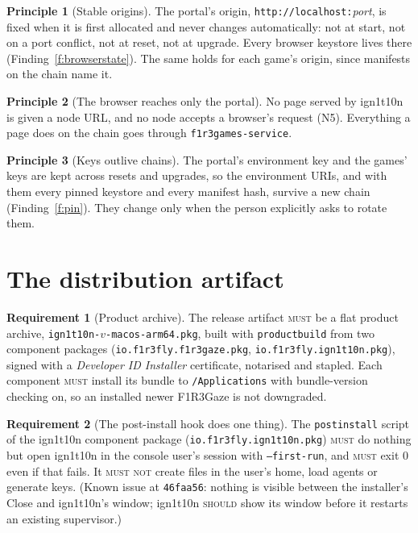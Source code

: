 \documentclass[11pt]{article}
\theoremstyle{definition}
\newtheorem{requirement}{Requirement}
\newtheorem{principle}{Principle}
\theoremstyle{remark}
\newcommand{\MUST}{\textsc{must}}
\newcommand{\MUSTNOT}{\textsc{must not}}
\newcommand{\SHOULD}{\textsc{should}}
\newcommand{\code}[1]{\texttt{#1}}
\newcommand{\Gz}{F1R3Gaze}
\newcommand{\Hr}{ign1t10n}
\newcommand{\Svc}{\code{f1r3games-service}}
\begin{document}
\begin{principle}[Stable origins]\label{p:origin}
The portal's origin, \code{http://localhost:}\textit{port}, is fixed when it is first
allocated and never changes automatically: not at start, not on a port conflict, not
at reset, not at upgrade. Every browser keystore lives there (Finding~\ref{f:browserstate}).
The same holds for each game's origin, since manifests on the chain name it.
\end{principle}

\begin{principle}[The browser reaches only the portal]\label{p:nonode}
No page served by \Hr{} is given a node URL, and no node accepts a browser's request
(N5). Everything a page does on the chain goes through \Svc{}.
\end{principle}

\begin{principle}[Keys outlive chains]\label{p:keys}
The portal's environment key and the games' keys are kept across resets and
upgrades, so the environment URIs, and with them every pinned keystore and every
manifest hash, survive a new chain (Finding~\ref{f:pin}). They change only when the
person explicitly asks to rotate them.
\end{principle}

\section{The distribution artifact}\label{sec:artifact}

\begin{requirement}[Product archive]
The release artifact \MUST{} be a flat product archive,
\code{ign1t10n-}$v$\code{-macos-arm64.pkg}, built with \code{productbuild} from two
component packages (\code{io.f1r3fly.f1r3gaze.pkg}, \code{io.f1r3fly.ign1t10n.pkg}),
signed with a \emph{Developer ID Installer} certificate, notarised and stapled. Each
component \MUST{} install its bundle to \code{/Applications} with bundle-version
checking on, so an installed newer \Gz{} is not downgraded.
\end{requirement}

\begin{requirement}[The post-install hook does one thing]
The \code{postinstall} script of the \Hr{} component package
(\code{io.f1r3fly.ign1t10n.pkg}) \MUST{} do nothing but open \Hr{} in the console user's session with \code{--first-run}, and \MUST{}
exit 0 even if that fails. It \MUSTNOT{} create files in the user's home, load agents
or generate keys. (Known issue at \code{46faa56}: nothing is visible between the
installer's Close and \Hr{}'s window; \Hr{} \SHOULD{} show its window before it
restarts an existing supervisor.)
\end{requirement}
\end{document}
